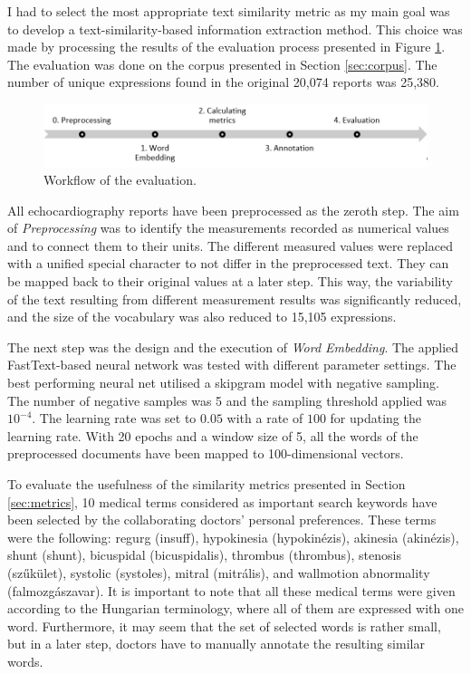 I had to select the most appropriate text similarity metric as my main goal was to develop a text-similarity-based information extraction method. This choice was made by processing the results of the evaluation process presented in Figure \ref{fig:evaluation_workflow}. The evaluation was done on the corpus presented in Section \ref{sec:corpus}. The number of unique expressions found in the original 20,074 reports was 25,380. 

\begin{figure}[h]
	\centering
        \captionsetup{justification=centering}
	\includegraphics[width=\textwidth]{assets/figures/text_mining/measures/workflow.png}
	\caption{Workflow of the evaluation.}
	\label{fig:evaluation_workflow}
\end{figure}

All echocardiography reports have been preprocessed as the zeroth step. The aim of \textit{Preprocessing} was to identify the measurements recorded as numerical values and to connect them to their units. The different measured values were replaced with a unified special character to not differ in the preprocessed text. They can be mapped back to their original values at a later step. This way, the variability of the text resulting from different measurement results was significantly reduced, and the size of the vocabulary was also reduced to 15,105 expressions.

The next step was the design and the execution of \textit{Word Embedding}. The applied FastText-based neural network was tested with different parameter settings. The best performing neural net utilised a skipgram model with negative sampling. The number of negative samples was 5 and the sampling threshold applied was $10^{-4}$. The learning rate was set to $0.05$ with a rate of $100$ for updating the learning rate. With 20 epochs and a window size of 5, all the words of the preprocessed documents have been mapped to 100-dimensional vectors.

To evaluate the usefulness of the similarity metrics presented in Section \ref{sec:metrics}, 10 medical terms considered as important search keywords have been selected by the collaborating doctors' personal preferences. These terms were the following: regurg (insuff), hypokinesia (hypokinézis), akinesia (akinézis), shunt (shunt), bicuspidal (bicuspidalis), thrombus (thrombus), stenosis (szűkület), systolic (systoles), mitral (mitrális), and wallmotion abnormality (falmozgászavar). It is important to note that all these medical terms were given according to the Hungarian terminology, where all of them are expressed with one word. Furthermore, it may seem that the set of selected words is rather small, but in a later step, doctors have to manually annotate the resulting similar words.

